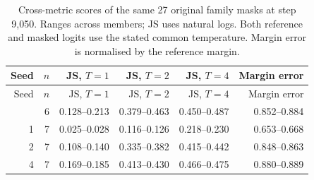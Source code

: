 \begingroup\small\setlength{\tabcolsep}{4pt}
\begin{longtable}{rrrrrr}
\caption{Cross-metric scores of the same 27 original family masks at step 9,050. Ranges across members; JS uses natural logs. Both reference and masked logits use the stated common temperature. Margin error is normalised by the reference margin.}\label{tab:originalmetrics}\\
\toprule
Seed & $n$ & JS, $T=1$ & JS, $T=2$ & JS, $T=4$ & Margin error \\

\midrule\endfirsthead
\toprule
Seed & $n$ & JS, $T=1$ & JS, $T=2$ & JS, $T=4$ & Margin error \\

\midrule\endhead
\bottomrule\endfoot
0 & 6 & 0.128--0.213 & 0.379--0.463 & 0.450--0.487 & 0.852--0.884 \\
1 & 7 & 0.025--0.028 & 0.116--0.126 & 0.218--0.230 & 0.653--0.668 \\
2 & 7 & 0.108--0.140 & 0.335--0.382 & 0.415--0.442 & 0.848--0.863 \\
4 & 7 & 0.169--0.185 & 0.413--0.430 & 0.466--0.475 & 0.880--0.889 \\
\end{longtable}
\endgroup
